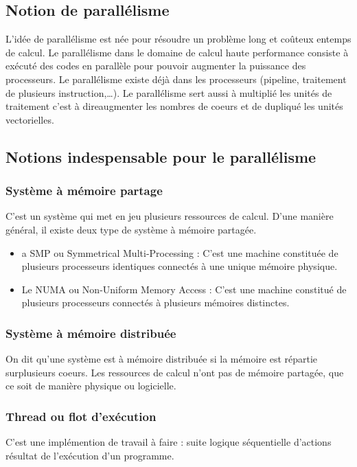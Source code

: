 \documentclass[11pt]{article}
\begin{document}
\subsection{Notion de parallélisme}
\label{sec:orgf8784ff}

L’idée de parallélisme est née pour résoudre un problème long et coûteux entemps de calcul.
Le parallélisme dans le domaine de calcul haute performance consiste à exécuté des codes en parallèle pour pouvoir augmenter la puissance des processeurs.
Le parallélisme existe déjà dans les processeurs (pipeline, traitement de plusieurs instruction,\ldots{}).
Le parallélisme sert aussi à multiplié les unités de traitement c’est à direaugmenter les nombres de coeurs et de dupliqué les unités vectorielles.

\subsection{Notions indespensable pour le parallélisme}
\label{sec:org45a0bae}
\subsubsection{Système à mémoire partage}
\label{sec:orgc06b532}

C’est un système qui met en jeu plusieurs ressources de calcul. D’une manière général, il existe deux type de système à mémoire partagée.
\begin{itemize}
\item a SMP ou Symmetrical Multi-Processing : C’est une machine constituée de plusieurs processeurs identiques connectés à une unique mémoire physique.
\item Le NUMA ou Non-Uniform Memory Access : C’est une machine constitué de plusieurs processeurs connectés à plusieurs mémoires distinctes.
\end{itemize}

\subsubsection{Système à mémoire distribuée}
\label{sec:org9a61031}
On dit qu’une système est à mémoire distribuée si la mémoire est répartie surplusieurs coeurs.
Les ressources de calcul n’ont pas de mémoire partagée, que ce soit de manière physique ou logicielle.
\subsubsection{Thread ou flot d’exécution}
\label{sec:org3686438}
C’est une implémention de travail à faire : suite logique séquentielle d’actions résultat de l’exécution d’un programme.
\end{document}

